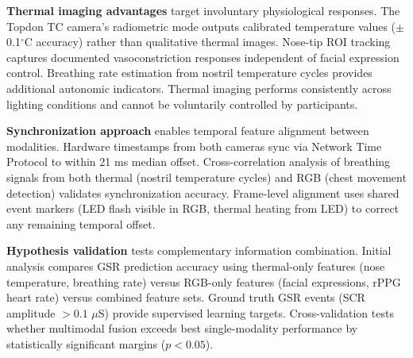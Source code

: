 \textbf{Thermal imaging advantages} target involuntary physiological responses. The Topdon TC camera's radiometric mode outputs calibrated temperature values ($\pm$0.1$^\circ$C accuracy) rather than qualitative thermal images. Nose-tip ROI tracking captures documented vasoconstriction responses independent of facial expression control. Breathing rate estimation from nostril temperature cycles provides additional autonomic indicators. Thermal imaging performs consistently across lighting conditions and cannot be voluntarily controlled by participants.

\textbf{Synchronization approach} enables temporal feature alignment between modalities. Hardware timestamps from both cameras sync via Network Time Protocol to within 21 ms median offset. Cross-correlation analysis of breathing signals from both thermal (nostril temperature cycles) and RGB (chest movement detection) validates synchronization accuracy. Frame-level alignment uses shared event markers (LED flash visible in RGB, thermal heating from LED) to correct any remaining temporal offset.

\textbf{Hypothesis validation} tests complementary information combination. Initial analysis compares GSR prediction accuracy using thermal-only features (nose temperature, breathing rate) versus RGB-only features (facial expressions, rPPG heart rate) versus combined feature sets. Ground truth GSR events (SCR amplitude $>0.1$ $\mu$S) provide supervised learning targets. Cross-validation tests whether multimodal fusion exceeds best single-modality performance by statistically significant margins ($p < 0.05$).

